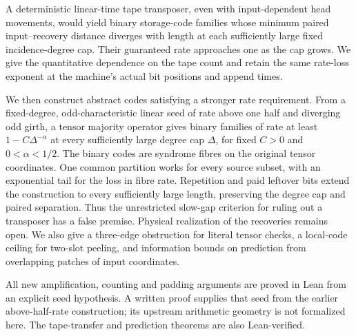 A deterministic linear-time tape transposer, even with input-dependent
head movements, would yield binary storage-code families whose minimum
paired input--recovery distance diverges with length at each sufficiently
large fixed incidence-degree cap. Their guaranteed rate approaches one as the cap
grows. We give the quantitative dependence on the
tape count and retain the same rate-loss exponent at the machine's actual
bit positions and append times.

We then construct abstract codes satisfying a stronger rate requirement.
From a fixed-degree, odd-characteristic linear seed of rate above one half
and diverging odd girth, a tensor majority operator gives binary families
of rate at least $1-C\Delta^{-\alpha}$ at every sufficiently large degree
cap $\Delta$, for fixed $C>0$ and $0<\alpha<1/2$. The binary codes are
syndrome fibres on the original tensor coordinates. One common partition
works for every source subset, with an exponential tail for the loss in
fibre rate. Repetition and paid leftover bits extend the construction to
every sufficiently large length, preserving the degree cap and paired
separation. Thus the unrestricted slow-gap criterion for ruling out a
transposer has a false premise. Physical realization of the recoveries
remains open. We also give a three-edge obstruction for literal tensor
checks, a local-code ceiling for two-slot peeling, and information bounds
on prediction from overlapping patches of input coordinates.

All new amplification, counting and padding arguments are proved in Lean
from an explicit seed hypothesis. A written proof supplies that seed
from the earlier above-half-rate construction; its upstream arithmetic
geometry is not formalized here. The tape-transfer and prediction
theorems are also Lean-verified.

